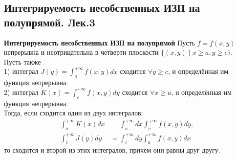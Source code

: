 \documentclass{article}
\begin{document}
\subsection{Интегрируемость несобственных ИЗП на полупрямой. Лек.3}
	\textbf{Интегрируемость несобственных ИЗП на полупрямой} Пусть $ f=f(x, y) $ непрерывна и неотрицательна в четверти плоскости $ \{(x, y) \mid x \geqslant a, y \geqslant c\}$. Пусть также\\ 
	1) интеграл $ J(y)=\int_{a}^{+\infty} f(x, y) d x $ сходится $\forall y \geqslant c$, и определённая им функция непрерывна.\\
	2) интеграл $ K(x)=\int_{c}^{+\infty} f(x, y) d y $ сходится $\forall x \geqslant a$, и определённая им функция непрерывна.\\ Тогда, если сходится один из двух интегралов:
	\begin{equation}
	\begin{aligned}
	\int_{a}^{+\infty} K(x)dx&=\int_{a}^{+\infty}dx\int_{c}^{+\infty}f(x, y)dy,\\
	\int_{c}^{+\infty} J(y)dy &= \int_{c}^{+\infty}dy\int_{a}^{+\infty} f(x, y) d x
	\end{aligned}
	\label{5.1}
	\end{equation}
	то сходится и второй из этих интегралов, причём они равны друг другу.
\end{document}
